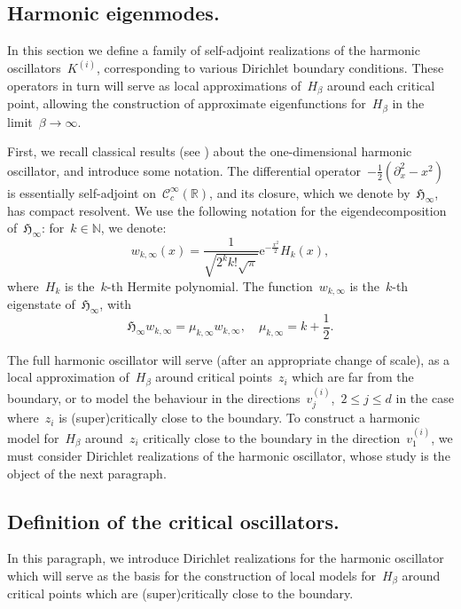 \documentclass[10pt]{article}
\newcommand{\e}{\mathrm{e}}
\newcommand{\R}{\mathbb{R}}
\newcommand{\N}{\mathbb N}
\newcommand{\1}{\mathbbm 1}
\newcommand{\hessEigvec}[2]{v^{(#1)}_{#2}} %
\newcommand{\Ki}[1]{K^{(i)}_{#1}}
\begin{document}
    \subsection{Harmonic eigenmodes.}
    In this section we define a family of self-adjoint realizations of the harmonic oscillators~$\Ki{}$, corresponding to various Dirichlet boundary conditions. These operators in turn will serve as local approximations of~$H_\beta$ around each critical point, allowing the construction of approximate eigenfunctions for~$H_\beta$ in the limit~$\beta\to\infty$.

    First, we recall classical results (see \cite{}) about the one-dimensional harmonic oscillator, and introduce some notation.
    The differential operator~$-\frac12\left(\partial_x^2-x^2\right)$ is essentially self-adjoint on~$\mathcal C_c^\infty(\R)$, and its closure, which we denote by~${\mathfrak H}_{\infty}$, has compact resolvent.
    We use the following notation for the eigendecomposition of~${\mathfrak H}_\infty$: for~$k\in\N$, we denote:
    \begin{equation}
        \label{eq:hermite_eigenfunction}
        w_{k,\infty}(x) = \frac{1}{\sqrt{2^k k! \sqrt\pi}}\e^{-\frac{x^2}2}H_k(x),
    \end{equation}
    where~$H_k$ is the~$k$-th Hermite polynomial. The function~$w_{k,\infty}$ is the~$k$-th eigenstate of~${\mathfrak H}_\infty$, with
    \begin{equation}
        \label{eq:hermite_eigenproblem}
         \mathfrak{H}_{\infty}w_{k,\infty} = \mu_{k,\infty} w_{k,\infty},\quad \mu_{k,\infty} = k + \frac12.
    \end{equation}

    The full harmonic oscillator will serve (after an appropriate change of scale), as a local approximation of~$H_\beta$ around critical points~$z_i$ which are far from the boundary, or to model the behaviour in the directions~$\hessEigvec{i}{j}$,~$2\leq j \leq d$ in the case where~$z_i$ is (super)critically close to the boundary.
    To construct a harmonic model for~$H_\beta$ around~$z_i$ critically close to the boundary in the direction~$\hessEigvec{i}{1}$, we must consider Dirichlet realizations of the harmonic oscillator, whose study is the object of the next paragraph.
    \subsection{Definition of the critical oscillators.}\label{subsec:critical_oscillators}
    In this paragraph, we introduce Dirichlet realizations for the harmonic oscillator which will serve as the basis for the construction of local models for~$H_\beta$ around critical points which are (super)critically close to the boundary.
\end{document}
